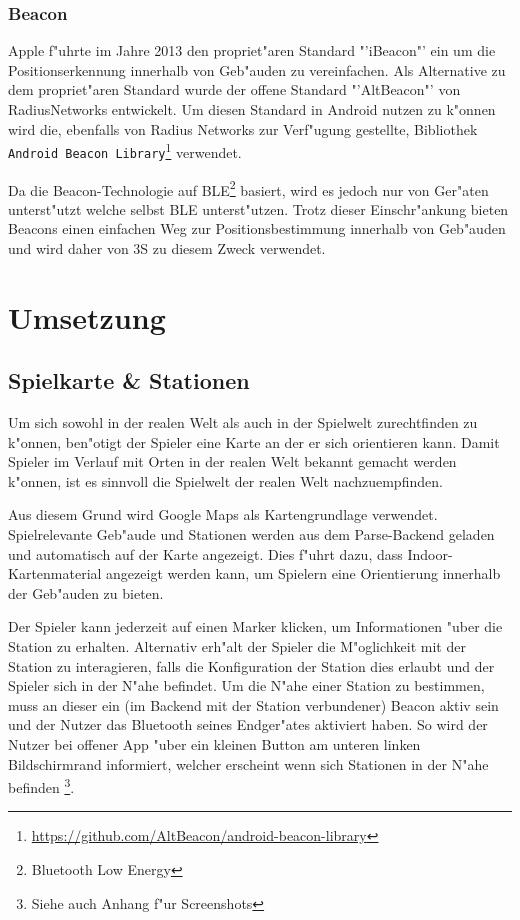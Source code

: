 \documentclass{article}
\begin{document}
\subsubsection{Beacon}
\label{subsubsec:beacon}
Apple f"uhrte im Jahre 2013 den propriet"aren Standard "'iBeacon"' ein um die Positionserkennung innerhalb von Geb"auden zu vereinfachen. Als Alternative zu dem propriet"aren Standard wurde der offene Standard "'AltBeacon"' von RadiusNetworks entwickelt. Um diesen Standard in Android nutzen zu k"onnen wird die, ebenfalls von Radius Networks zur Verf"ugung gestellte, Bibliothek \texttt{Android Beacon Library}\footnote{\url{https://github.com/AltBeacon/android-beacon-library}} verwendet.

Da die Beacon-Technologie auf BLE\footnote{Bluetooth Low Energy} basiert, wird es jedoch nur von Ger"aten unterst"utzt welche selbst BLE unterst"utzen. Trotz dieser Einschr"ankung bieten Beacons einen einfachen Weg zur Positionsbestimmung innerhalb von Geb"auden und wird daher von 3S zu diesem Zweck verwendet.

\section{Umsetzung}
\label{sec:umsetzung}

\subsection{Spielkarte \& Stationen}
\label{subsec:spielkarte}
Um sich sowohl in der realen Welt als auch in der Spielwelt zurechtfinden zu k"onnen, ben"otigt der Spieler eine Karte an der er sich orientieren kann. Damit  Spieler im Verlauf mit Orten in der realen Welt bekannt gemacht werden k"onnen, ist es sinnvoll die Spielwelt der realen Welt nachzuempfinden.

Aus diesem Grund wird Google Maps als Kartengrundlage verwendet. Spielrelevante Geb"aude und Stationen werden aus dem Parse-Backend geladen und automatisch auf der Karte angezeigt. Dies f"uhrt dazu, dass Indoor-Kartenmaterial angezeigt werden kann, um Spielern eine Orientierung innerhalb der Geb"auden zu bieten. 

Der Spieler kann jederzeit auf einen Marker klicken, um Informationen "uber die Station zu erhalten. Alternativ erh"alt der Spieler die M"oglichkeit mit der Station zu interagieren, falls die Konfiguration der Station dies erlaubt und der Spieler sich in der N"ahe befindet. Um die N"ahe einer Station zu bestimmen, muss an dieser ein (im Backend mit der Station verbundener) Beacon aktiv sein und der Nutzer das Bluetooth seines Endger"ates aktiviert haben. So wird der Nutzer bei offener App "uber ein kleinen Button am unteren linken Bildschirmrand informiert, welcher erscheint wenn sich Stationen in der N"ahe befinden \footnote{Siehe auch Anhang f"ur Screenshots}.
\end{document}
